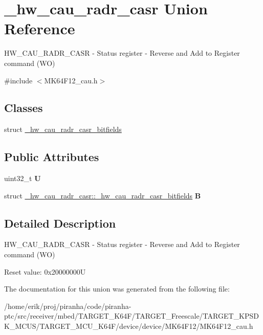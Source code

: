 \hypertarget{union__hw__cau__radr__casr}{}\section{\+\_\+hw\+\_\+cau\+\_\+radr\+\_\+casr Union Reference}
\label{union__hw__cau__radr__casr}


H\+W\+\_\+\+C\+A\+U\+\_\+\+R\+A\+D\+R\+\_\+\+C\+A\+SR -\/ Status register -\/ Reverse and Add to Register command (WO)  




{\ttfamily \#include $<$M\+K64\+F12\+\_\+cau.\+h$>$}

\subsection*{Classes}
\begin{DoxyCompactItemize}
\item 
struct \hyperlink{struct__hw__cau__radr__casr_1_1__hw__cau__radr__casr__bitfields}{\+\_\+hw\+\_\+cau\+\_\+radr\+\_\+casr\+\_\+bitfields}
\end{DoxyCompactItemize}
\subsection*{Public Attributes}
\begin{DoxyCompactItemize}
\item 
uint32\+\_\+t {\bfseries U}\hypertarget{union__hw__cau__radr__casr_a1aae098c7abca3426c264748d40092e2}{}\label{union__hw__cau__radr__casr_a1aae098c7abca3426c264748d40092e2}

\item 
struct \hyperlink{struct__hw__cau__radr__casr_1_1__hw__cau__radr__casr__bitfields}{\+\_\+hw\+\_\+cau\+\_\+radr\+\_\+casr\+::\+\_\+hw\+\_\+cau\+\_\+radr\+\_\+casr\+\_\+bitfields} {\bfseries B}\hypertarget{union__hw__cau__radr__casr_a702feb4f4af140e1f653cf3f3c503463}{}\label{union__hw__cau__radr__casr_a702feb4f4af140e1f653cf3f3c503463}

\end{DoxyCompactItemize}


\subsection{Detailed Description}
H\+W\+\_\+\+C\+A\+U\+\_\+\+R\+A\+D\+R\+\_\+\+C\+A\+SR -\/ Status register -\/ Reverse and Add to Register command (WO) 

Reset value\+: 0x20000000U 

The documentation for this union was generated from the following file\+:\begin{DoxyCompactItemize}
\item 
/home/erik/proj/piranha/code/piranha-\/ptc/src/receiver/mbed/\+T\+A\+R\+G\+E\+T\+\_\+\+K64\+F/\+T\+A\+R\+G\+E\+T\+\_\+\+Freescale/\+T\+A\+R\+G\+E\+T\+\_\+\+K\+P\+S\+D\+K\+\_\+\+M\+C\+U\+S/\+T\+A\+R\+G\+E\+T\+\_\+\+M\+C\+U\+\_\+\+K64\+F/device/device/\+M\+K64\+F12/M\+K64\+F12\+\_\+cau.\+h\end{DoxyCompactItemize}
